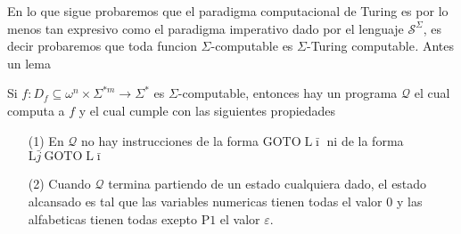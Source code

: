 \begin{frame}

  En lo que sigue probaremos que el paradigma computacional de Turing
es por lo menos tan expresivo como el paradigma imperativo dado por el
lenguaje $\mathcal{S}^{\Sigma }$, es decir probaremos que toda funcion $%
\Sigma $-computable es $\Sigma $-Turing computable\textit{.} Antes un lema

\bigskip

\begin{lemma}
\label{sinGOTO}Si $f:D_{f}\subseteq \omega ^{n}\times \Sigma ^{\ast
m}\rightarrow \Sigma ^{\ast }$ es $\Sigma $-computable, entonces hay un
programa $\mathcal{Q}$ el cual computa a $f$ y el cual cumple con las
siguientes propiedades

\begin{enumerate}
\item[(1)] En $\mathcal{Q}$ no hay instrucciones de la forma $\mathrm{GOTO}\;%
\mathrm{L}\bar{\imath}$ ni de la forma $\mathrm{L}\bar{j}\ \mathrm{GOTO}\;%
\mathrm{L}\bar{\imath}$

\item[(2)] Cuando $\mathcal{Q}$ termina partiendo de un estado cualquiera
dado, el estado alcansado es tal que las variables numericas tienen todas el
valor $0$ y las alfabeticas tienen todas exepto $\mathrm{P}1$ el valor $%
\varepsilon $.
\end{enumerate}
\end{lemma}

\end{frame}
